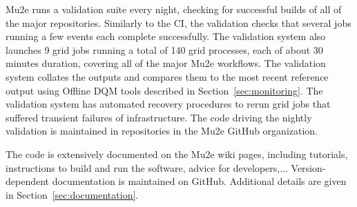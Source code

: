 Mu2e runs a validation suite every night, checking for successful builds of all of the major repositories. Similarly to the CI, the validation checks that several jobs running a few events each complete successfully. The validation system also launches 9 grid jobs running a total of 140 grid processes, each of about 30 minutes duration, covering all of the major Mu2e workflows. The validation system collates the outputs and compares them to the most recent reference output using Offline DQM tools described in Section~\ref{sec:monitoring}. The validation system has automated recovery procedures to rerun grid jobs that suffered transient failures of infrastructure. The code driving the nightly validation is maintained in repositories in the Mu2e GitHub organization.

The code is extensively documented on the Mu2e wiki pages, including tutorials, instructions to build and run the software, advice for developers,... Version-dependent documentation is maintained on GitHub. Additional details are given in Section~\ref{sec:documentation}.
